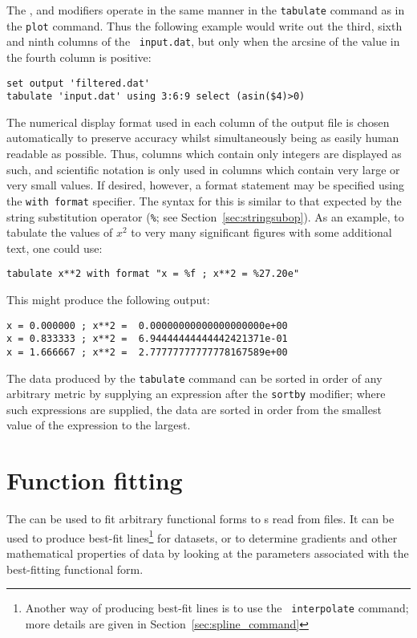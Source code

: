 The ,  and  modifiers operate in
the same manner in the {\tt tabulate} command as in the {\tt plot} command.
Thus the following example would write out the third, sixth and ninth columns
of the \datafile\ {\tt input.dat}, but only when the arcsine of the value in the
fourth column is positive:

\begin{verbatim}
set output 'filtered.dat'
tabulate 'input.dat' using 3:6:9 select (asin($4)>0)
\end{verbatim}

The numerical display format used in each column of the output file is chosen
automatically to preserve accuracy whilst simultaneously being as easily human
readable as possible.  Thus, columns which contain only integers are displayed
as such, and scientific notation is only used in columns which contain very
large or very small values.  If desired, however, a format statement may be
specified using the {\tt with format} specifier. The syntax for this is similar
to that expected by the string substitution operator ({\tt \%}; see
Section~\ref{sec:stringsubop}). As an example, to tabulate the values of $x^2$
to very many significant figures with some additional text, one could use:

\begin{verbatim}
tabulate x**2 with format "x = %f ; x**2 = %27.20e"
\end{verbatim}

\noindent This might produce the following output:

\begin{verbatim}
x = 0.000000 ; x**2 =  0.00000000000000000000e+00
x = 0.833333 ; x**2 =  6.94444444444442421371e-01
x = 1.666667 ; x**2 =  2.77777777777778167589e+00
\end{verbatim}

The data produced by the {\tt tabulate} command can be sorted in order of any
arbitrary metric by supplying an expression after the {\tt sortby} modifier;
where such expressions are supplied, the data are sorted in order from the
smallest value of the expression to the largest.


\section{Function fitting}
\label{sec:fit_command}

The  can be used to fit arbitrary functional forms to \datapoint s
read from files. It can be used to produce best-fit lines\footnote{Another way of producing best-fit lines is to use the {\tt
interpolate} command; more details are given in
Section~\ref{sec:spline_command}} for datasets, or to determine gradients and
other mathematical properties of data by looking at the parameters associated
with the best-fitting functional form.

